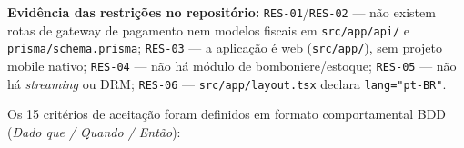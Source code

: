 \textbf{Evidência das restrições no repositório:} \texttt{RES-01}/\texttt{RES-02} --- não existem rotas de gateway de pagamento nem modelos fiscais em \texttt{src/app/api/} e \texttt{prisma/schema.prisma}; \texttt{RES-03} --- a aplicação é web (\texttt{src/app/}), sem projeto mobile nativo; \texttt{RES-04} --- não há módulo de bomboniere/estoque; \texttt{RES-05} --- não há \emph{streaming} ou DRM; \texttt{RES-06} --- \texttt{src/app/layout.tsx} declara \texttt{lang="pt-BR"}.




Os 15 critérios de aceitação foram definidos em formato comportamental BDD (\emph{Dado que / Quando / Então}):

